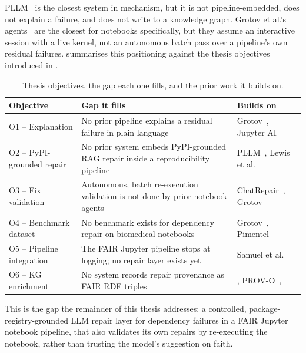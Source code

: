 PLLM~\cite{bartlett2025pllm} is the closest system in mechanism, but it is
not pipeline-embedded, does not explain a failure, and does not write to a
knowledge graph. Grotov et al.'s agents~\cite{grotov2024untangling,
grotov2024debug} are the closest for notebooks specifically, but they assume
an interactive session with a live kernel, not an autonomous batch pass over
a pipeline's own residual failures.  summarises this
positioning against the thesis objectives introduced in
.

\begin{table}[h]
  \centering
  \begin{tabular}{|l|p{5.2cm}|p{4.3cm}|}
    \hline
    \textbf{Objective} & \textbf{Gap it fills} & \textbf{Builds on} \\
    \hline
    O1 -- Explanation & No prior pipeline explains a residual failure in plain language & Grotov~\cite{grotov2024untangling,grotov2024debug}, Jupyter AI~\cite{jupyterai2023} \\
    \hline
    O2 -- PyPI-grounded repair & No prior system embeds PyPI-grounded RAG repair inside a reproducibility pipeline & PLLM~\cite{bartlett2025pllm}, Lewis et al.~\cite{lewis2020rag} \\
    \hline
    O3 -- Fix validation & Autonomous, batch re-execution validation is not done by prior notebook agents & ChatRepair~\cite{xia2024chatrepair}, Grotov~\cite{grotov2024debug} \\
    \hline
    O4 -- Benchmark dataset & No benchmark exists for dependency repair on biomedical notebooks & Grotov~\cite{grotov2024untangling}, Pimentel~\cite{pimentel2019msr} \\
    \hline
    O5 -- Pipeline integration & The FAIR Jupyter pipeline stops at logging; no repair layer exists yet & Samuel et al.~\cite{samuel2025docker,samuel2024gigascience,samuel2024fairkg} \\
    \hline
    O6 -- KG enrichment & No system records repair provenance as FAIR RDF triples & \cite{samuel2024fairkg}, PROV-O~\cite{provenance2013}, \cite{wilkinson2016fair} \\
    \hline
  \end{tabular}
  \caption{Thesis objectives, the gap each one fills, and the prior work it builds on.}
  \label{tab:rw-gap}
\end{table}

This is the gap the remainder of this thesis addresses: a controlled,
package-registry-grounded LLM repair layer for dependency failures in a FAIR
Jupyter notebook pipeline, that also validates its own repairs by
re-executing the notebook, rather than trusting the model's suggestion on
faith.

